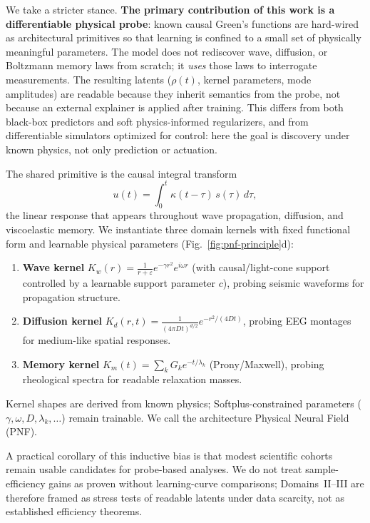 \documentclass[twocolumn, 10pt]{article}
\newcommand{\pnf}{\textsc{PNF}}
\begin{document}
We take a stricter stance. \textbf{The primary contribution of this work is a differentiable physical probe}: known causal Green's functions are hard-wired as architectural primitives so that learning is confined to a small set of physically meaningful parameters. The model does not rediscover wave, diffusion, or Boltzmann memory laws from scratch; it \emph{uses} those laws to interrogate measurements. The resulting latents (\(\rho(t)\), kernel parameters, mode amplitudes) are readable because they inherit semantics from the probe, not because an external explainer is applied after training. This differs from both black-box predictors and soft physics-informed regularizers, and from differentiable simulators optimized for control\cite{hu2020difftaichi,xiao2025}: here the goal is discovery under known physics, not only prediction or actuation.

The shared primitive is the causal integral transform
\[
u(t)=\int_{0}^{t}\kappa(t-\tau)\,s(\tau)\,d\tau,
\]
the linear response that appears throughout wave propagation, diffusion, and viscoelastic memory\cite{akei2002,morse1953}. We instantiate three domain kernels with fixed functional form and learnable physical parameters (Fig.~\ref{fig:pnf-principle}d):
\begin{enumerate}
\item \textbf{Wave kernel} \(K_w(r)=\frac{1}{r+\varepsilon}e^{-\gamma r^{2}}e^{i\omega r}\) (with causal/light-cone support controlled by a learnable support parameter \(c\)), probing seismic waveforms for propagation structure.
\item \textbf{Diffusion kernel} \(K_d(r,t)=\frac{1}{(4\pi Dt)^{d/2}}e^{-r^{2}/(4Dt)}\), probing EEG montages for medium-like spatial responses.
\item \textbf{Memory kernel} \(K_m(t)=\sum_k G_ke^{-t/\lambda_k}\) (Prony/Maxwell), probing rheological spectra for readable relaxation masses.
\end{enumerate}
Kernel shapes are derived from known physics; Softplus-constrained parameters (\(\gamma,\omega,D,\lambda_k,\ldots\)) remain trainable. We call the architecture Physical Neural Field (\pnf{}).

A practical corollary of this inductive bias is that modest scientific cohorts remain usable candidates for probe-based analyses\cite{tripanpitak2026,dekeulenaer2025,sharma2025,lu2025}. We do not treat sample-efficiency gains as proven without learning-curve comparisons; Domains~II--III are therefore framed as stress tests of readable latents under data scarcity, not as established efficiency theorems.
\end{document}
